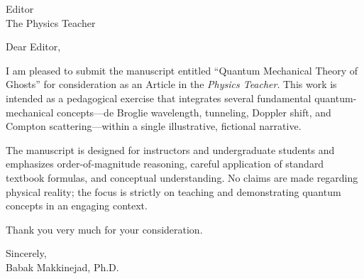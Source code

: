 \documentclass[12pt]{letter}
\begin{document}
\begin{letter}{Editor\\
The Physics Teacher}

\opening{Dear Editor,}

I am pleased to submit the manuscript entitled ``Quantum Mechanical Theory of Ghosts'' for consideration as an Article in the \emph{Physics Teacher}. This work is intended as a pedagogical exercise that integrates several fundamental quantum-mechanical concepts—de Broglie wavelength, tunneling, Doppler shift, and Compton scattering—within a single illustrative, fictional narrative.

The manuscript is designed for instructors and undergraduate students and emphasizes order-of-magnitude reasoning, careful application of standard textbook formulas, and conceptual understanding. No claims are made regarding physical reality; the focus is strictly on teaching and demonstrating quantum concepts in an engaging context.

Thank you very much for your consideration.

\closing{Sincerely,\\[2ex]%
Babak Makkinejad, Ph.D.}

\end{letter}
\end{document}
